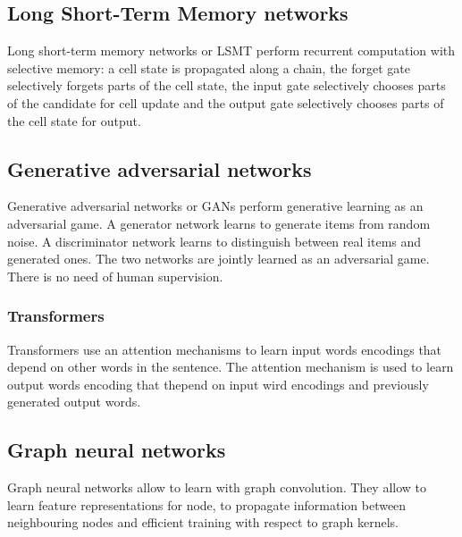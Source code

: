 	\subsection{Long Short-Term Memory networks}
	Long short-term memory networks or LSMT perform recurrent computation with selective memory: a cell state is propagated along a chain, the forget gate selectively forgets parts of the cell state, the input gate selectively chooses parts of the candidate for cell update and the output gate selectively chooses parts of the cell state for output.

	\subsection{Generative adversarial networks}
	Generative adversarial networks or GANs perform generative learning as an adversarial game.
	A generator network learns to generate items from random noise.
	A discriminator network learns to distinguish between real items and generated ones.
	The two networks are jointly learned as an adversarial game.
	There is no need of human supervision.

		\subsubsection{Transformers}
		Transformers use an attention mechanisms to learn input words encodings that depend on other words in the sentence.
		The attention mechanism is used to learn output words encoding that thepend on input wird encodings and previously generated output words.

	\subsection{Graph neural networks}
	Graph neural networks allow to learn with graph convolution.
	They allow to learn feature representations for node, to propagate information between neighbouring nodes and efficient training with respect to graph kernels.

